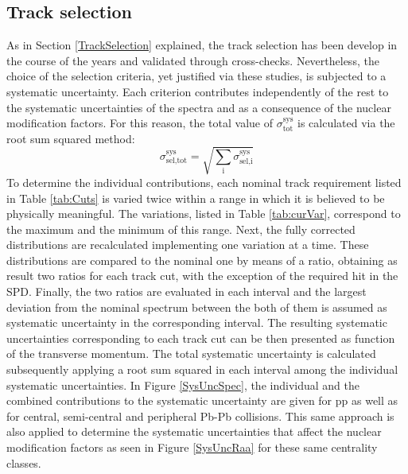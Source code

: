 \documentclass[12pt,a4paper]{report}
\begin{document}
\subsection{Track selection} 
As in Section \ref{TrackSelection} explained, the track selection has been develop in the course of the years and validated through cross-checks. Nevertheless, the choice of the selection criteria, yet justified via these studies, is subjected to a systematic uncertainty. Each criterion contributes independently of the rest to the systematic uncertainties of the \pt spectra and as a consequence of the nuclear modification factors. For this reason, the total value of $\sigma^\text{sys}_\text{tot}$ is calculated via the root sum squared method:
\begin{equation}
\sigma^\text{sys}_\text{sel,tot} = \sqrt{\sum_{\text{i}}\sigma^\text{sys}_\text{sel,i}}
\end{equation} 
To determine the individual contributions, each nominal track requirement listed in Table \ref{tab:Cuts} is varied twice within a range in which it is believed to be physically meaningful. The variations, listed in Table \ref{tab:curVar}, correspond to the maximum and the minimum of this range. Next, the fully corrected \pt distributions are recalculated implementing one variation at a time. These \pt distributions are compared to the nominal one by means of a ratio, obtaining as result two ratios for each track cut, with the exception of the required hit in the SPD. Finally, the two ratios are evaluated in each \pt interval and the largest deviation from the nominal \pt spectrum between the both of them is assumed as systematic uncertainty in the corresponding \pt interval. The resulting systematic uncertainties corresponding to each track cut can be then presented as function of the transverse momentum. The total systematic uncertainty is calculated subsequently applying a root sum squared in each \pt interval among the individual systematic uncertainties. In Figure \ref{SysUncSpec}, the individual and the combined contributions to the systematic uncertainty are given for pp as well as for central, semi-central and peripheral Pb-Pb collisions. This same approach is also applied to determine the systematic uncertainties that affect the nuclear modification factors as seen in Figure \ref{SysUncRaa} for these same centrality classes.
\end{document}
